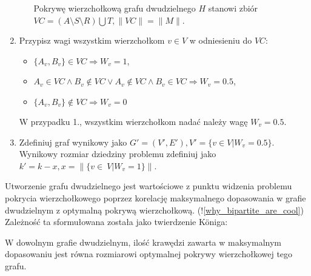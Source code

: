 \begin{enumerate}
\begin{itemize}
        Pokrywę wierzchołkową grafu dwudzielnego $H$ stanowi zbiór 
        ${VC=(A \setminus S \setminus R) \bigcup T}, \|VC\|=\|M\|$.
    \end{itemize}
  \item Przypisz wagi wszystkim wierzchołkom $v \in V$ w odniesieniu do $VC$:
    \begin{itemize}
      \item $\{A_v, B_v\} \in VC \Rightarrow W_v=1$,
      \item $A_v \in VC \land B_v \notin VC \lor A_v \notin VC \land B_v \in
        VC \Rightarrow W_v=0.5$,
      \item $\{A_v, B_v\} \notin VC \Rightarrow W_v=0$
    \end{itemize}
    W przypadku 1., wszystkim wierzchołkom nadać należy wagę $W_v=0.5$.
  \item Zdefiniuj graf wynikowy jako 
    $G\prime=(V\prime, E\prime), V\prime=\{v \in V|W_v=0.5\}$.
    Wynikowy rozmiar dziedziny problemu zdefiniuj jako 
    ${k\prime=k-x, x=\|\{v\in~V|W_v=1\}}\|$.
\end{enumerate}

Utworzenie grafu dwudzielnego jest wartościowe z punktu widzenia problemu
pokrycia wierzchołkowego poprzez korelację maksymalnego dopasowania w grafie
dwudzielnym z optymalną pokrywą wierzchołkową. (!\ref{why_bipartite_are_cool})
Zależność ta sformułowana została jako twierdzenie K\"oniga:

\begin{konig*}
  W dowolnym grafie dwudzielnym, ilość krawędzi zawarta w maksymalnym
  dopasowaniu jest równa rozmiarowi optymalnej pokrywy wierzchołkowej tego
  grafu.
\end{konig*}

